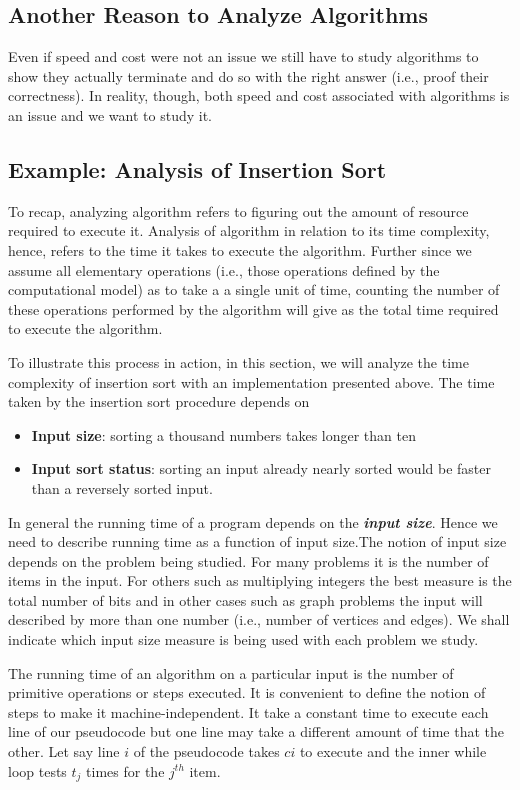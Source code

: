 \documentclass[12pt,a4paper]{book}
\begin{document}
\subsection{Another Reason to Analyze Algorithms}
Even if speed and cost were not an issue we still have to study algorithms to show they actually terminate and do so with the right answer (i.e., proof their correctness). In reality, though, both speed and cost associated with algorithms is an issue and we want to study it.
\subsection{Example: Analysis of Insertion Sort}
To recap, analyzing algorithm refers to figuring out the amount of resource required to execute it. Analysis of algorithm in relation to its time complexity, hence, refers to the time it takes to execute the algorithm. Further since we assume all elementary operations (i.e., those operations defined by the computational model) as to take a a single unit of time, counting the number of these operations performed by the algorithm will give as the total time required to execute the algorithm. 

\par To illustrate this process in action, in this section, we will analyze the time complexity of insertion sort with an implementation presented above. The time taken by the insertion sort procedure depends on
\begin{itemize}
\item \textbf{Input size}: sorting a thousand numbers takes longer than ten
\item \textbf{Input sort status}: sorting an input already nearly sorted would be faster than a reversely sorted input.
\end{itemize}
\par In general the running time of a program depends on the \textbf{\textit{input size}}. Hence we need to describe running time as a function of input size.The notion of input size depends on the problem being studied. For many problems it is the number of items in the input. For others such as multiplying integers the best measure is the total number of bits and in other cases such as graph problems the input will described by more than one number (i.e., number of vertices and edges). We shall indicate which input size measure is being used with each problem we study.
\par  The running time of an algorithm on a particular input is the number of primitive operations or steps executed. It is convenient to define the notion of steps to make it machine-independent. It take a constant time to execute each line of our pseudocode but one line may take a different amount of time that the other. Let say line $i$ of the pseudocode takes $c{i}$ to execute and the inner while loop tests $t_{j}$ times for the $ j^{th}$ item. 
\end{document}
